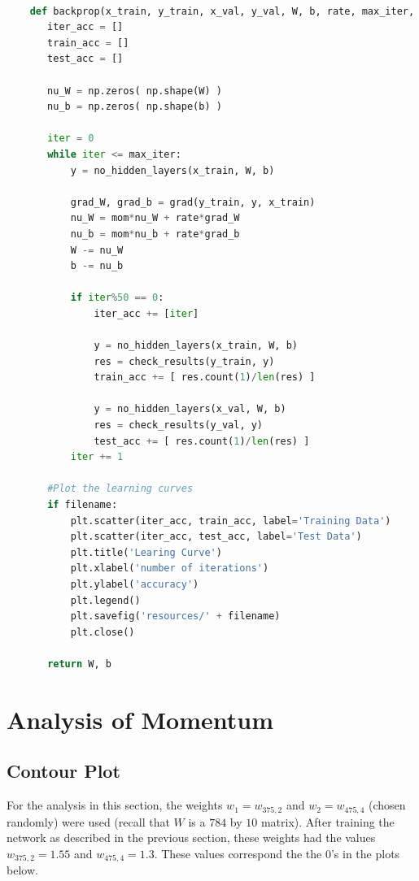 \documentclass{article}
\begin{document}
  \begin{lstlisting}[language=Python]

    def backprop(x_train, y_train, x_val, y_val, W, b, rate, max_iter, mom=0, filename=''):
       iter_acc = []
       train_acc = []
       test_acc = []

       nu_W = np.zeros( np.shape(W) )
       nu_b = np.zeros( np.shape(b) )

       iter = 0
       while iter <= max_iter:
           y = no_hidden_layers(x_train, W, b)

           grad_W, grad_b = grad(y_train, y, x_train)
           nu_W = mom*nu_W + rate*grad_W
           nu_b = mom*nu_b + rate*grad_b
           W -= nu_W
           b -= nu_b

           if iter%50 == 0:
               iter_acc += [iter]

               y = no_hidden_layers(x_train, W, b)
               res = check_results(y_train, y)
               train_acc += [ res.count(1)/len(res) ]

               y = no_hidden_layers(x_val, W, b)
               res = check_results(y_val, y)
               test_acc += [ res.count(1)/len(res) ]
           iter += 1

       #Plot the learning curves
       if filename:
           plt.scatter(iter_acc, train_acc, label='Training Data')
           plt.scatter(iter_acc, test_acc, label='Test Data')
           plt.title('Learing Curve')
           plt.xlabel('number of iterations')
           plt.ylabel('accuracy')
           plt.legend()
           plt.savefig('resources/' + filename)
           plt.close()

       return W, b
   \end{lstlisting}






   \section{Analysis of Momentum}


   \subsection{Contour Plot}
   For the analysis in this section, the weights $w_1 = w_{375,2}$ and $w_2 = w_{475,4}$
   (chosen randomly) were used (recall that $W$ is
   a $784$ by $10$ matrix). After training the network as described in the previous section,
   these weights had the values $w_{375,2} = 1.55$ and $w_{475,4} = 1.3$. These values correspond the the
   $0$'s in the plots below.
\end{document}
